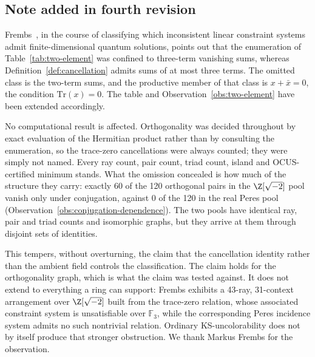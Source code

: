 
\subsection*{Note added in fourth revision}

\begin{sloppypar}
Frembs~\cite{Frembs2026}, in the course of classifying which inconsistent linear
constraint systems admit finite-dimensional quantum solutions, points out that the
enumeration of Table~\ref{tab:two-element} was confined to three-term vanishing
sums, whereas Definition~\ref{def:cancellation} admits sums of at most three
terms.  The omitted class is the two-term sums, and the productive member of that
class is $x + \bar x = 0$, the condition $\mathrm{Tr}(x) = 0$.  The table and
Observation~\ref{obs:two-element} have been extended accordingly.

No computational result is affected.  Orthogonality was decided throughout by
exact evaluation of the Hermitian product rather than by consulting the
enumeration, so the trace-zero cancellations were always counted; they were simply
not named.  Every ray count, pair count, triad count, island and OCUS-certified
minimum stands.  What the omission concealed is how much of the structure they
carry: exactly 60 of the 120 orthogonal pairs in the $\Z[\sqrt{-2}]$ pool vanish
only under conjugation, against 0 of the 120 in the real Peres pool
(Observation~\ref{obs:conjugation-dependence}).  The two pools have identical ray,
pair and triad counts and isomorphic graphs, but they arrive at them through
disjoint sets of identities.

This tempers, without overturning, the claim that the cancellation identity rather
than the ambient field controls the classification.  The claim holds for the
orthogonality graph, which is what the claim was tested against.  It does not
extend to everything a ring can support: Frembs exhibits a 43-ray, 31-context
arrangement over $\Z[\sqrt{-2}]$ built from the trace-zero relation, whose
associated constraint system is unsatisfiable over $\mathbb{F}_3$, while the
corresponding Peres incidence system admits no such nontrivial relation.  Ordinary
KS-uncolorability does not by itself produce that stronger obstruction.  We thank
Markus Frembs for the observation.
\end{sloppypar}


